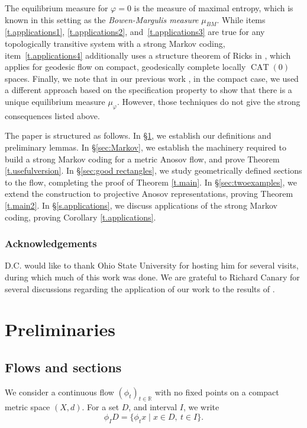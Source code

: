 \documentclass[10pt]{amsart}
\let\sep\mid
\theoremstyle{definition}
\numberwithin{equation}{section}
\DeclareMathOperator{\CAT}{CAT}
\begin{document}
The equilibrium measure for $\varphi=0$ is the measure of maximal entropy, which is known in this setting as the \emph{Bowen-Margulis measure} $\mu_{BM}$. While items \eqref{t.applications1}, \eqref{t.applications2}, and~\eqref{t.applications3} are true for any topologically transitive system with a strong Markov coding, item~\eqref{t.applications4} additionally uses a structure theorem of Ricks in \cite{ricks}, which applies for geodesic flow on compact, geodesically complete locally $\CAT(0)$ spaces. Finally, we note that in our previous work \cite{CLT}, in the compact case, we used a different approach based on the specification property to show that there is a unique equilibrium measure $\mu_\varphi$. However, those techniques do not give the strong consequences listed above.

The paper is structured as follows. In \S \ref{sec:background}, we establish our definitions and preliminary lemmas. In \S \ref{sec:Markov}, we establish the machinery required to build a strong Markov coding for a metric Anosov flow, and prove Theorem \ref{t.usefulversion}. In \S\ref{sec:good rectangles}, we study geometrically defined sections to the flow, completing the proof of Theorem \ref{t.main}. In \S \ref{sec:twoexamples}, we extend the construction to projective Anosov representations, proving Theorem \ref{t.main2}. In \S \ref{s.applications}, we discuss applications of the strong Markov coding, proving Corollary \ref{t.applications}.

\subsubsection*{Acknowledgements}
D.C. would like to thank Ohio State University for hosting him for several visits, during which much of this work was done. We are grateful to Richard Canary for several discussions regarding the application of our work to the results of \cite{bcls}.

\section{Preliminaries}\label{sec:background}

\subsection{Flows and sections}

We consider a continuous flow $(\phi_t)_{t \in \mathbb R}$ with no fixed points on a compact metric space $(X, d)$. For a set $D$, and interval $I$, we write
\[ \phi_I D = \{\phi_t x \sep x \in D, \ t \in I\}. \]
\end{document}
